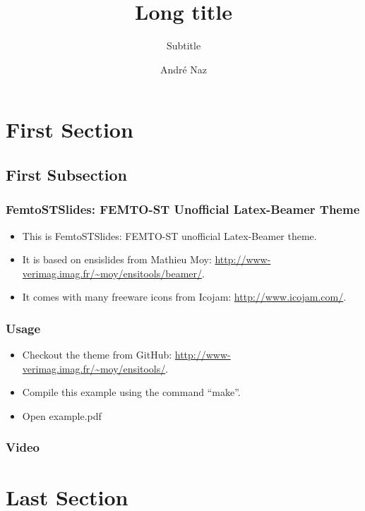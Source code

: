 \documentclass{beamer}
\title[Short title]{Long title}
\subtitle{Subtitle} %
\author{André Naz}
\institute{Femto-st}
\begin{document}
\begin{frame}
  \titlepage
\end{frame}

\section{First Section}

\subsection{First Subsection}

\begin{frame} \frametitle{FemtoSTSlides: FEMTO-ST Unofficial Latex-Beamer Theme}
  
  \begin{itemize}
  \item This is FemtoSTSlides: FEMTO-ST unofficial Latex-Beamer theme.
  \item It is based on ensislides from Mathieu Moy: \url{http://www-verimag.imag.fr/~moy/ensitools/beamer/}.
  \item It comes with many freeware icons from Icojam: \url{http://www.icojam.com/}. 
  \pause
  \end{itemize}

\end{frame}

\begin{frame} \frametitle{Usage}
  
  \begin{itemize}
  \item Checkout the theme from GitHub: \url{http://www-verimag.imag.fr/~moy/ensitools/}.
  \item Compile this example using the command ``make''.
  \item Open example.pdf
  \end{itemize}
\end{frame}

\begin{frame} \frametitle{Video}
\begin{center}
\end{center}
\end{frame}

\section{Last Section}
\end{document}
